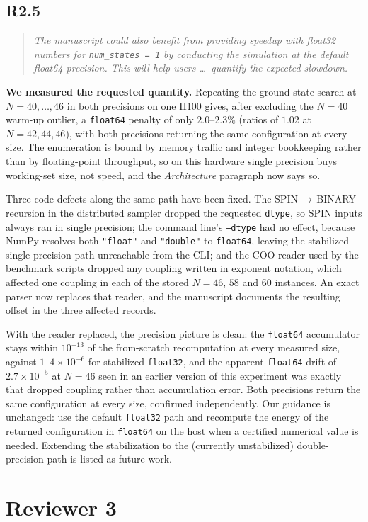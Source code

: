 \documentclass[11pt,a4paper]{article}
\newenvironment{reviewercomment}
  {\begin{quote}\itshape\small}
  {\end{quote}}
\newcommand{\point}[2]{%
  \subsection*{#1}%
  \begin{reviewercomment}#2\end{reviewercomment}}
\begin{document}
\point{R2.5}{The manuscript could also benefit from providing speedup with float32 numbers for
\texttt{num\_states = 1} by conducting the simulation at the default float64 precision. This
will help users \dots\ quantify the expected slowdown.}

\textbf{We measured the requested quantity.} Repeating the ground-state search at
$N=40,\dots,46$ in both precisions on one H100 gives, after excluding the $N=40$ warm-up
outlier, a \texttt{float64} penalty of only $2.0$--$2.3\%$ (ratios of $1.02$ at
$N=42,44,46$), with both precisions returning the same configuration at every size. The
enumeration is bound by memory traffic and integer bookkeeping rather than by floating-point
throughput, so on this hardware single precision buys working-set size, not speed, and
the \emph{Architecture} paragraph now says so.

Three code defects along the same path have been fixed. The SPIN$\,\to\,$BINARY recursion in
the distributed sampler dropped the requested \texttt{dtype}, so SPIN inputs always ran in
single precision; the command line's \texttt{--dtype} had no effect, because NumPy resolves
both \texttt{"float"} and \texttt{"double"} to \texttt{float64}, leaving the stabilized
single-precision path unreachable from the CLI; and the COO reader used by the benchmark
scripts dropped any coupling written in exponent notation, which affected one coupling in each
of the stored $N=46$, $58$ and $60$ instances. An exact parser now replaces that reader, and
the manuscript documents the resulting offset in the three affected records.

With the reader replaced, the precision picture is clean: the \texttt{float64} accumulator
stays within $10^{-13}$ of the from-scratch recomputation at every measured size, against
$1$--$4\times10^{-6}$ for stabilized \texttt{float32}, and the apparent \texttt{float64} drift
of $2.7\times10^{-5}$ at $N=46$ seen in an earlier version of this experiment was exactly that
dropped coupling rather than accumulation error. Both precisions return the same configuration
at every size, confirmed independently. Our guidance is unchanged: use the
default \texttt{float32} path and recompute the energy of the returned configuration in
\texttt{float64} on the host when a certified numerical value is needed. Extending the
stabilization to the (currently unstabilized) double-precision path is listed as future work.

\section*{Reviewer 3}
\end{document}
